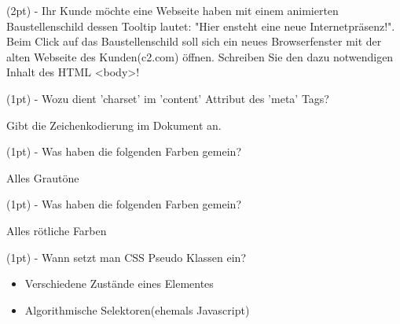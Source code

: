 \documentclass[10pt,ngerman]{examdesign}
\begin{document}
\begin{shortanswer}

  \begin{question}
    (2pt) - Ihr Kunde m\"ochte eine Webseite haben mit einem animierten
    Baustellenschild dessen Tooltip lautet: "Hier ensteht eine neue
    Internetpr\"asenz!". Beim Click auf das Baustellenschild soll sich ein
    neues Browserfenster mit der alten Webseite des Kunden(c2.com) \"offnen.
    Schreiben Sie den dazu notwendigen Inhalt des HTML <body>!
    \begin{answer}
    \end{answer}
  \end{question}

  \begin{question}
    (1pt) - Wozu dient 'charset' im 'content' Attribut des 'meta' Tags?
    \begin{answer}
      Gibt die Zeichenkodierung im Dokument an.
    \end{answer}
  \end{question}

  \begin{block}
    \begin{question}
      (1pt) - Was haben die folgenden Farben gemein?
      \begin{answer}
        Alles Graut\"one
      \end{answer}
    \end{question}

    \begin{question}
      (1pt) - Was haben die folgenden Farben gemein?
      \begin{answer}
        Alles r\"otliche Farben
      \end{answer}
    \end{question}
  \end{block}

  \begin{question}
    (1pt) - Wann setzt man CSS Pseudo Klassen ein?
    \begin{answer}
      \begin{itemize}
        \item Verschiedene Zust\"ande eines Elementes
        \item Algorithmische Selektoren(ehemals Javascript)
      \end{itemize}
    \end{answer}
  \end{question}

\end{shortanswer}
\end{document}
